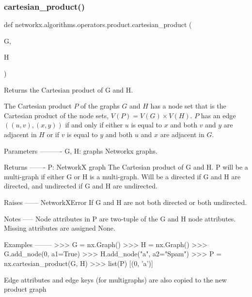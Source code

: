 \subsubsection{\texorpdfstring{cartesian\+\_\+product()}{cartesian\_product()}}
{\footnotesize\ttfamily def networkx.\+algorithms.\+operators.\+product.\+cartesian\+\_\+product (\begin{DoxyParamCaption}\item[{}]{G,  }\item[{}]{H }\end{DoxyParamCaption})}

\begin{DoxyVerb}Returns the Cartesian product of G and H.

The Cartesian product $P$ of the graphs $G$ and $H$ has a node set that
is the Cartesian product of the node sets, $V(P)=V(G) \times V(H)$.
$P$ has an edge $((u,v),(x,y))$ if and only if either $u$ is equal to $x$
and both $v$ and $y$ are adjacent in $H$ or if $v$ is equal to $y$ and
both $u$ and $x$ are adjacent in $G$.

Parameters
----------
G, H: graphs
 Networkx graphs.

Returns
-------
P: NetworkX graph
 The Cartesian product of G and H. P will be a multi-graph if either G
 or H is a multi-graph. Will be a directed if G and H are directed,
 and undirected if G and H are undirected.

Raises
------
NetworkXError
 If G and H are not both directed or both undirected.

Notes
-----
Node attributes in P are two-tuple of the G and H node attributes.
Missing attributes are assigned None.

Examples
--------
>>> G = nx.Graph()
>>> H = nx.Graph()
>>> G.add_node(0, a1=True)
>>> H.add_node("a", a2="Spam")
>>> P = nx.cartesian_product(G, H)
>>> list(P)
[(0, 'a')]

Edge attributes and edge keys (for multigraphs) are also copied to the
new product graph
\end{DoxyVerb}
 \mbox{\label{namespacenetworkx_1_1algorithms_1_1operators_1_1product_a5edd4339754f8c3930f3c795bcc23cfa}} 
